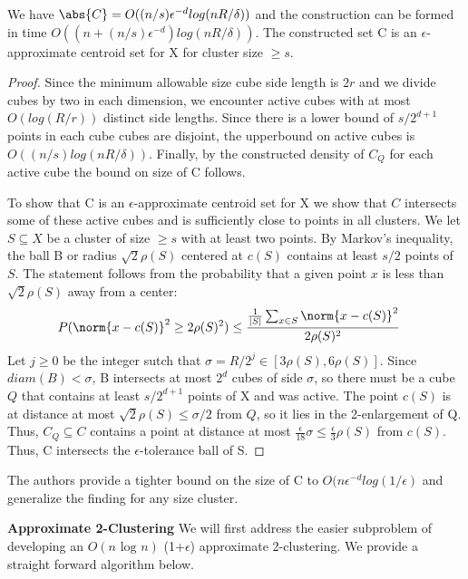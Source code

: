 \begin{lemma}We have $\abs{C} = O((n/s)\epsilon^{-d}log(nR/\delta))$ and the construction can be formed in time $O((n+(n/s)\epsilon^{-d})log(nR/\delta))$. The constructed set C is an $\epsilon$-approximate centroid set for X for cluster size $\geq s$.
\end{lemma}
\begin{proof}
Since the minimum allowable size cube side length is $2r$ and we divide cubes by two in each dimension, we encounter active cubes with at most $O(log(R/r))$ distinct side lengths. Since there is a lower bound of $s/2^{d+1}$ points in each cube cubes are disjoint, the upperbound on active cubes is $O((n/s)log(nR/\delta))$. Finally, by the constructed density of $C_Q$ for each active cube the bound on size of C follows. 

\noindent To show that C is an $\epsilon$-approximate centroid set for X we show that $C$ intersects some of these active cubes and is sufficiently close to points in all clusters. We let $S \subseteq X$ be a cluster of size $\geq s$ with at least two points. By Markov's inequality, the ball B or radius $\sqrt{2}\rho(S)$ centered at $c(S)$ contains at least $s/2$ points of $S$. The statement follows from the probability that a given point $x$ is less than $\sqrt{2}\rho(S)$ away from a center:
\begin{align*}
    P(\norm{x-c(S)}^2 \geq 2\rho(S)^2) & \leq \frac{\frac{1}{|S|}\sum_{x\in S} \norm{x-c(S)}^2 }{2\rho(S)^2} 
\end{align*}
Let $j \geq 0$ be the integer sutch that $\sigma = R/2^j \in [3\rho(S),6\rho(S)]$. Since $diam(B) < \sigma$, B intersects at most $2^d$ cubes of side $\sigma$, so there must be a cube $Q$ that contains at least $s/2^{d+1}$ points of X and was active. The point $c(S)$ is at distance at most $\sqrt{2}\rho(S) \leq \sigma/2$ from $Q$, so it lies in the 2-enlargement of Q. Thus, $C_Q \subseteq C$ contains a point at distance at most $\frac{\epsilon}{18} \sigma \leq \frac{\epsilon}{3}\rho(S)$ from $c(S)$. Thus, C intersects the $\epsilon$-tolerance ball of S. 
\end{proof}

\begin{remark}
The authors provide a tighter bound on the size of C to $O(n\epsilon^{-d}log(1/\epsilon)$ and generalize the finding for any size cluster.
\end{remark}
\newpage
\noindent\textbf{Approximate 2-Clustering}
We will first address the easier subproblem of developing an $O(n \text{ log } n)$ (1+$\epsilon$) approximate 2-clustering. We provide a straight forward algorithm below.


